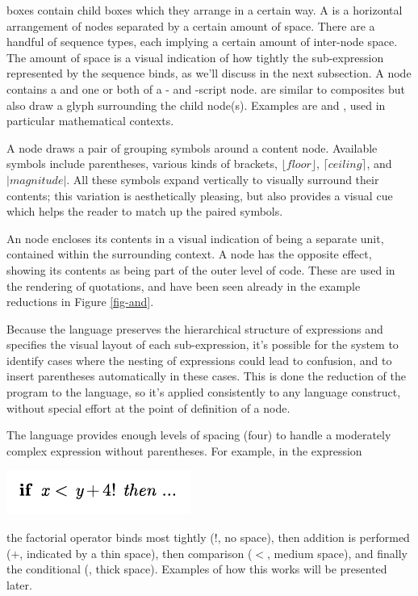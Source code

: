  boxes contain child boxes which they arrange in a certain way. A  is a horizontal arrangement of nodes separated by a certain amount of space. There are a handful of sequence types, each implying a certain amount of inter-node space. The amount of space is a visual indication of how tightly the sub-expression represented by the sequence binds, as we'll discuss in the next subsection. A  node contains a  and one or both of a - and -script node.  are similar to composites but also draw a glyph surrounding the child node(s). Examples are  and , used in particular mathematical contexts.

A  node draws a pair of grouping symbols around a content node. Available symbols include parentheses, various kinds of brackets, $\lfloor\mathit{floor}\rfloor$, $\lceil\mathit{ceiling}\rceil$, and $|\mathit{magnitude}|$. All these symbols expand vertically to visually surround their contents; this variation is aesthetically pleasing, but also provides a visual cue which helps the reader to match up the paired symbols.

An  node encloses its contents in a visual indication of being a separate unit, contained within the surrounding context. A  node has the opposite effect, showing its contents as being part of the outer level of code. These are used in the rendering of quotations, and have been seen already in the example reductions in Figure \ref{fig-and}.

Because the  language preserves the hierarchical structure of expressions and specifies the visual layout of each sub-expression, it's possible for the system to identify cases where the nesting of expressions could lead to confusion, and to insert parentheses automatically in these cases. This is done  the reduction of the program to the  language, so it's applied consistently to any language construct, without special effort at the point of definition of a node. 

The  language provides enough levels of spacing (four) to handle a moderately complex expression without parentheses. For example, in the expression
\begin{center}
\includegraphics{src/image/space.pdf}
\end{center}  %
the factorial operator binds most tightly ($!$, no space), then addition is performed ($+$, indicated by a thin space), then comparison ($<$, medium space), and finally the conditional (, thick space). Examples of how this works will be presented later.



